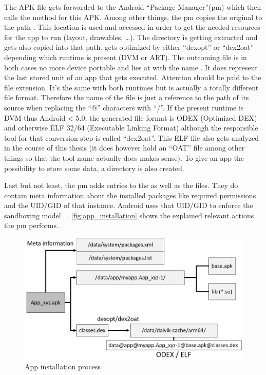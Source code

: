 The APK file gets forwarded to the Android ``Package Manager''(pm)
which then calls the  method for this
APK. Among other things, the pm copies the original 
to the path .
This location is used and accessed in order to get the
needed resources for the app to run (layout, drawables, \ldots).
The  directory is getting extracted and gets also copied
into that path.  gets optimized by either ``dexopt''
or ``dex2oat'' depending which runtime is present (DVM or ART).
The outcoming file is in both cases no more device portable
and lies at  with the name
.
It does represent the last stored unit of an app that gets
executed. Attention should be paid to the file extension.
It's the same with both runtimes but is actually a totally
different file format.
Therefore the name of the file is just a reference to the path
of its source when replacing the ``@'' characters with ``/''.
If the present runtime is DVM thus Android < 5.0, the generated
file format is ODEX (Optimized DEX) and otherwise
ELF 32/64 (Executable Linking Format) although the responsible
tool for that conversion step is called ``dex2oat''. This ELF
file also gets analyzed in the course of this thesis
(it does however hold an ``OAT'' file among other things so that
the tool name actually does makes sense).
To give an app the possibility to
store some data, a  directory is
also created.

Last but not least, the pm adds entries to the
 as well as the
 files. They do contain
meta information about the installed packages like
required permissions and the UID/GID of that instance.
Android uses that UID/GID to enforce the sandboxing model
~\parencite{securityinternals}.
\autoref{fig:app_installation} shows the explained
relevant actions the pm performs.

\begin{figure}[htb]
  \includegraphics[width=\textwidth]{figures/app_installation}
  \caption[App installation process]{App installation process}
  \label{fig:app_installation}
\end{figure}

